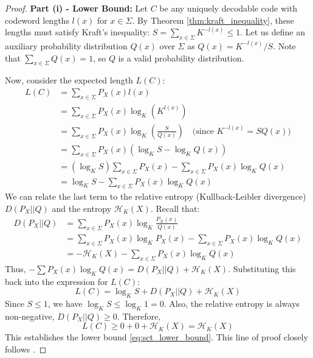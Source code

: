\begin{proof}
    \textbf{Part (i) - Lower Bound:}
    Let $C$ be any uniquely decodable code with codeword lengths $l(x)$ for $x \in \Sigma$. By Theorem \ref{thm:kraft_inequality}, these lengths must satisfy Kraft's inequality: $S = \sum_{x \in \Sigma} K^{-l(x)} \leq 1$.
    Let us define an auxiliary probability distribution $Q(x)$ over $\Sigma$ as $Q(x) = K^{-l(x)} / S$. Note that $\sum_{x \in \Sigma} Q(x) = 1$, so $Q$ is a valid probability distribution.

    Now, consider the expected length $L(C)$:
    \begin{align}
        L(C) & = \sum_{x \in \Sigma} P_X(x) l(x)                                                                                  \\
             & = \sum_{x \in \Sigma} P_X(x) \log_K \left( K^{l(x)} \right)                                                        \\
             & = \sum_{x \in \Sigma} P_X(x) \log_K \left( \frac{S}{Q(x)} \right) \quad \text{(since } K^{-l(x)} = S Q(x) \text{)} \\
             & = \sum_{x \in \Sigma} P_X(x) \left( \log_K S - \log_K Q(x) \right)                                                 \\
             & = (\log_K S) \sum_{x \in \Sigma} P_X(x) - \sum_{x \in \Sigma} P_X(x) \log_K Q(x)                                   \\
             & = \log_K S - \sum_{x \in \Sigma} P_X(x) \log_K Q(x)
    \end{align}
    We can relate the last term to the relative entropy (Kullback-Leibler divergence) $D(P_X || Q)$ and the entropy $\mathcal{H}_K(X)$. Recall that:
    \begin{align*}
        D(P_X || Q) & = \sum_{x \in \Sigma} P_X(x) \log_K \frac{P_X(x)}{Q(x)}                             \\
                    & = \sum_{x \in \Sigma} P_X(x) \log_K P_X(x) - \sum_{x \in \Sigma} P_X(x) \log_K Q(x) \\
                    & = -\mathcal{H}_K(X) - \sum_{x \in \Sigma} P_X(x) \log_K Q(x)
    \end{align*}
    Thus, $-\sum P_X(x) \log_K Q(x) = D(P_X || Q) + \mathcal{H}_K(X)$.
    Substituting this back into the expression for $L(C)$:
    \begin{equation}
        L(C) = \log_K S + D(P_X || Q) + \mathcal{H}_K(X)
    \end{equation}
    Since $S \le 1$, we have $\log_K S \le \log_K 1 = 0$. Also, the relative entropy is always non-negative, $D(P_X || Q) \ge 0$. Therefore,
    \begin{equation}
        L(C) \ge 0 + 0 + \mathcal{H}_K(X) = \mathcal{H}_K(X)
    \end{equation}
    This establishes the lower bound \eqref{eq:sct_lower_bound}. This line of proof closely follows \cite{ElementsofInformationTheory}.


\end{proof}
